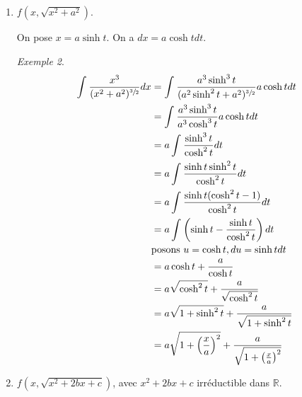 \documentclass{report}
\newcommand*{\dint}[3]{\displaystyle\int_{#1}^{#2}#3}
\newcommand*{\reels}{\mathbb{R}}
\newcommand*{\complexes}{\mathbb{C}}
\theoremstyle{definition}
\theoremstyle{remark}
\newtheorem*{exem}{Exemple}
\newtheorem*{rema}{Remarque}
\newtheorem*{rapp}{Rappel}
\begin{document}
\begin{enumerate}
\begin{rapp}
			Formellement,
			\begin{align*}
				\begin{split}
					\sinh x&= \dfrac{e^z-e^{-z}}{2}
				\end{split}
				&
				\begin{split}
					\cosh x&= \dfrac{e^z+e^{-z}}{2}
				\end{split}
			\end{align*}
			avec $z \in \complexes$.
		\end{rapp}

		$f\left( x,\sqrt{x^2-a^2} \right)$.

		On pose $x = a \cosh t$. On a $dx = a \sinh t dt$.
		\begin{exem}
			\begin{align*}
				\dint{}{}{\dfrac{x^2}{\sqrt{x^2-a^2}} dx}&= \dint{}{}{\dfrac{a^2\cosh^2t}{\sqrt{a^2\cosh^2t-a^2}}a\sinh tdt}\\
				&= \dint{}{}{\dfrac{a^2\cosh^2t}{a\sinh t}a\sinh tdt}\\
				&= \dint{}{}{a^2\cosh^2tdt}\\
				&= \dint{}{}{a^2 \dfrac{a+\cosh 2t}{2}dt}\\
				&= \dfrac{a^2t}{2} + \dfrac{a^2}{2}\dfrac{\sinh2t}{2}
			\end{align*}
		\end{exem}
		\begin{rema}
			$\mathrm{arccosh}t = \ln\left( t+\sqrt{t^2-1} \right)$, $\mathrm{arcsinh}t = \ln\left( t+\sqrt{1+t^2} \right)$.
		\end{rema}
		\newpage
		\item $f\left( x, \sqrt{x^2+a^2} \right)$.

		On pose $x = a\sinh t$. On a $dx = a\cosh t dt$.
		\begin{exem}
			\begin{align*}
				\dint{}{}{\dfrac{x^3}{(x^2+a^2)^{\sfrac{3}{2}}} dx}&= \dint{}{}{\dfrac{a^3\sinh^3t}{(a^2\sinh^2t+a^2)^{\sfrac{3}{2}}} a\cosh t dt}\\
				&= \dint{}{}{\dfrac{a^3\sinh^3t}{a^3\cosh^3t} a\cosh t dt}\\
				&= a\dint{}{}{\dfrac{\sinh^3t}{\cosh^2t} dt}\\
				&= a\dint{}{}{\dfrac{\sinh t \sinh^2t}{\cosh^2t} dt}\\
				&= a\dint{}{}{\dfrac{\sinh t (\cosh^2t-1)}{\cosh^2t} dt}\\
				&= a\dint{}{}{\left( \sinh t - \dfrac{\sinh t}{\cosh^2t} \right) dt}\\
				&\text{posons }u=\cosh t, du=\sinh t dt\\
				&= a\cosh t + \dfrac{a}{\cosh t}\\
				&= a\sqrt{\cosh^2t} + \dfrac{a}{\sqrt{\cosh^2t}}\\
				&= a\sqrt{1+\sinh^2t} + \dfrac{a}{\sqrt{1+\sinh^2t}}\\
				&= a\sqrt{1+ \left( \frac{x}{a} \right) ^2} + \dfrac{a}{\sqrt{1+ \left( \frac{x}{a} \right) ^2}}
			\end{align*}
		\end{exem}
		\item $f\left( x,\sqrt{x^2+2bx+c} \right)$, avec $x^2+2bx+c$ irr\'eductible dans $\reels$.


\end{enumerate}
\end{document}
